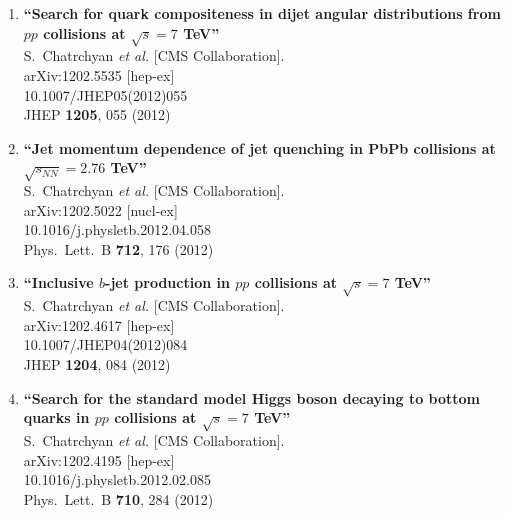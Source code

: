 \documentclass{article}
\begin{document}
\begin{enumerate}
\item%
{\bf ``Search for quark compositeness in dijet angular distributions from $pp$ collisions at $\sqrt{s}=7$ TeV''}
  \\{}S.~Chatrchyan {\it et al.}  [CMS Collaboration].
  \\{}arXiv:1202.5535 [hep-ex]
    \\{}10.1007/JHEP05(2012)055
\\{}JHEP {\bf 1205}, 055 (2012) %


\item%
{\bf ``Jet momentum dependence of jet quenching in PbPb collisions at $\sqrt{s_{NN}}=2.76$ TeV''}
  \\{}S.~Chatrchyan {\it et al.}  [CMS Collaboration].
  \\{}arXiv:1202.5022 [nucl-ex]
    \\{}10.1016/j.physletb.2012.04.058
\\{}Phys.\ Lett.\ B {\bf 712}, 176 (2012) %


\item%
{\bf ``Inclusive $b$-jet production in $pp$ collisions at $\sqrt{s}=7$ TeV''}
  \\{}S.~Chatrchyan {\it et al.}  [CMS Collaboration].
  \\{}arXiv:1202.4617 [hep-ex]
    \\{}10.1007/JHEP04(2012)084
\\{}JHEP {\bf 1204}, 084 (2012) %


\item%
{\bf ``Search for the standard model Higgs boson decaying to bottom quarks in $pp$ collisions at $\sqrt{s}=7$ TeV''}
  \\{}S.~Chatrchyan {\it et al.}  [CMS Collaboration].
  \\{}arXiv:1202.4195 [hep-ex]
    \\{}10.1016/j.physletb.2012.02.085
\\{}Phys.\ Lett.\ B {\bf 710}, 284 (2012) %



\end{enumerate}
\end{document}
